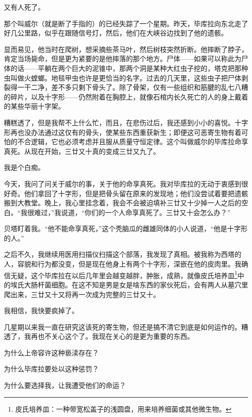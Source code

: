 \documentclass[AutoFakeBold=true]{book}
\begin{document}
又有人死了。

那个叫威尔（就是断了手指的）的已经失踪了一个星期。昨天，毕库拉向东北走了好几公里路，似乎在跟随信号灯，然后，他们在大峡谷边找到了他的遗骸。

显而易见，他当时在爬树，想采摘些茶马叶，然后树枝突然折断。他摔断了脖子，肯定当场毙命，但是更为紧要的是他摔落的那个地方。尸体——如果可以称此为尸体的话——平躺在两个巨大的泥锥中，那两个洞是某种大红虫子挖的，塔克把那种虫叫做火螳螂。地毯甲虫也许是更恰当的名字。过去的几天里，这些虫子把尸体剥裂得一干二净，差不多只剩下骨头了。除了骨架，仅有一些组织和筋腱的乱七八糟的碎片，以及十字形——仍然附着在胸腔上，就像石棺内长久死亡的人的身上戴着的某些华丽十字架。

糟糕透了，但是我帮不上什么忙，而且，在悲伤过后，我还感到小小的喜悦。十字形再也没办法通过这仅有的骨头，使某些东西重获新生；即便这可恶寄生物有着可怕的不合逻辑，它也必须考虑并且服从质量守恒定律。这个叫做威尔的毕库拉命享真死。从现在开始，三廿又十真的变成三廿又九了。

\vspace*{1em}{\kaishu 第一百七十四日：}

我是个白痴。

今天，我问了问关于威尔的事，关于他的命享真死。我对毕库拉的无动于衷感到很好奇。他们拿回了十字形，但是把骨头留在原来的发现地；他们没尝试着要把遗骸搬到大教堂。晚上，我心里挂念着，我会不会被迫填补三廿又十少掉一人之后的空白。``我很难过，''我说道，``你们的一个人命享真死了。三廿又十会怎么办？''

贝塔盯着我。``他不能命享真死，''这个秃脑瓜的雌雄同体的小人说道，``他是十字形的人。''

之后不久，我继续用医用扫描仪扫描这个部落，我发现了真相。被我称为西塔的人，容貌和行为都没变，但是现在他身上有两个十字形，深嵌在他的皮肉里。我确信无疑，这个毕库拉在以后几年里会越变越胖，肿胀，成熟，就像皮氏培养皿\footnote{皮氏培养皿：一种带宽松盖子的浅圆盘，用来培养细菌或其他微生物。}中的埃氏大肠杆菌细胞。在这不知是男是女是啥东西的家伙死后，会有两人从墓穴里爬出来，三廿又十又将再一次成为完整的三廿又十。

我相信，我快要疯掉了。

\vspace*{1em}{\kaishu 第一百九十五日：}

几星期以来我一直在研究这该死的寄生物，但还是搞不清它到底是如何运作的。糟透了，我再也不关心这个了。我现在关心的是更为重要的东西。

为什么上帝容许这种亵渎存在？

为什么毕库拉要处以这种惩罚？

为什么要选择我，让我遭受他们的命运？
\end{document}
